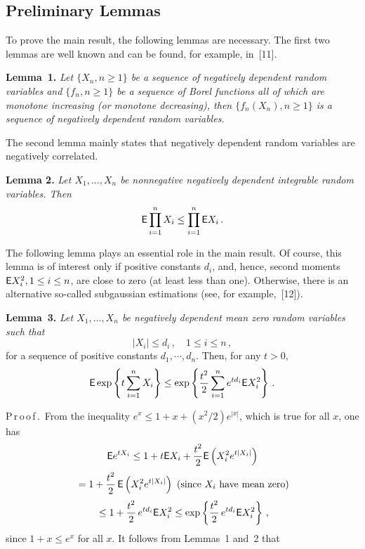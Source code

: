 \begin{multicols}{2}
\section{Preliminary Lemmas}

\noindent
To prove the main result, the following lemmas are necessary. The first two lemmas are well known and can be found,
for example, in~[11].

\medskip
\noindent 
\textbf{Lemma~1.} \textit{Let $\{X_n, n\ge 1\}$ be a sequence of negatively dependent  random variables and
$\{f_n, n\ge 1\}$ be a sequence of Borel functions all of which are monotone increasing (or monotone
decreasing), then $\{f_n(X_n), n\ge 1\}$ is a sequence of negatively dependent random variables.}

The second lemma mainly states that negatively dependent random variables are 
negatively correlated.

\medskip

\noindent 
\textbf{Lemma 2.} {\it Let $X_1,\dots, X_n$ be nonnegative negatively dependent integrable random variables. Then}
$$ 
{\sf E} \prod\limits_{i=1}^n X_i \le \prod\limits_{i=1}^n {\sf E}X_i\,. 
$$

\medskip

The following lemma plays an essential role in the main result. Of course, this lemma is of interest only if
positive constants $d_i$, and, hence, second moments ${\sf E}X_i^2, 1\le i \le n$, are close to zero (at least less than
one). Otherwise, there is an alternative so-called subgaussian estimations 
(see, for example,~[12]).

\medskip

\noindent 
\textbf{Lemma~3.} \textit{Let $X_1,\dots, X_n$ be negatively dependent  mean zero random variables such
that}
$$
\left|X_i\right|\le d_i\,, \quad 1\le i\le n\,,
$$
for a sequence of positive constants $d_1,\cdots, d_n$. Then, for any $t>0,$
$$ 
{\sf E} \exp\left\{t\sum\limits_{i=1}^n X_i\right\} \le \exp\left\{\displaystyle\frac{\displaystyle t^2\mathstrut}{\displaystyle 2\mathstrut} 
\sum\limits_{i=1}^n e^{td_i} {\sf E}X_i^2 \right\}\,.
$$

\noindent 

P\,r\,o\,o\,f\,.\ From the inequality 
$e^x\le 1+x+({x^2}/{2}) e^{|x|}$, which is true for all $x$, one
has
\begin{multline*}
{\sf E} e^{tX_i} \le 1+ t{\sf E}X_i + \displaystyle\frac{\displaystyle t^2\mathstrut}{\displaystyle 2\mathstrut} {\sf E} \left(X_i^2 e^{t|X_i|}\right) \\
{}= 1+ \displaystyle\frac{\displaystyle t^2\mathstrut}{\displaystyle 2\mathstrut}\, {\sf E}\left( X_i^2 e^{t|X_i|}\right) \mbox{ (since $X_i$ have mean zero)} \\
{}\le 1+ \displaystyle\frac{\displaystyle t^2\mathstrut}{\displaystyle 2\mathstrut}\,e^{td_i}  {\sf E}X_i^2 \le \exp\left\{ \displaystyle\frac{\displaystyle t^2\mathstrut}{\displaystyle 2\mathstrut}\,e^{td_i} {\sf E}X_i^2\right\}\,,
\end{multline*}
since $1+x \le e^x$ for all $x$. It follows from Lemmas~1 and~2 that


\end{multicols}
